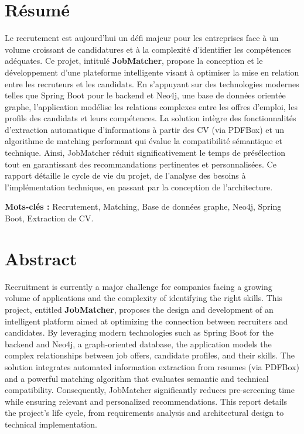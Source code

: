 \documentclass[12pt,a4paper]{report}
\begin{document}
\chapter*{Résumé}
Le recrutement est aujourd'hui un défi majeur pour les entreprises face à un volume croissant de candidatures et à la complexité d'identifier les compétences adéquates. Ce projet, intitulé \textbf{JobMatcher}, propose la conception et le développement d'une plateforme intelligente visant à optimiser la mise en relation entre les recruteurs et les candidats. En s'appuyant sur des technologies modernes telles que Spring Boot pour le backend et Neo4j, une base de données orientée graphe, l'application modélise les relations complexes entre les offres d'emploi, les profils des candidats et leurs compétences. La solution intègre des fonctionnalités d'extraction automatique d'informations à partir des CV (via PDFBox) et un algorithme de matching performant qui évalue la compatibilité sémantique et technique. Ainsi, JobMatcher réduit significativement le temps de présélection tout en garantissant des recommandations pertinentes et personnalisées. Ce rapport détaille le cycle de vie du projet, de l'analyse des besoins à l'implémentation technique, en passant par la conception de l'architecture.

\textbf{Mots-clés :} Recrutement, Matching, Base de données graphe, Neo4j, Spring Boot, Extraction de CV.
\clearpage

\chapter*{Abstract}
Recruitment is currently a major challenge for companies facing a growing volume of applications and the complexity of identifying the right skills. This project, entitled \textbf{JobMatcher}, proposes the design and development of an intelligent platform aimed at optimizing the connection between recruiters and candidates. By leveraging modern technologies such as Spring Boot for the backend and Neo4j, a graph-oriented database, the application models the complex relationships between job offers, candidate profiles, and their skills. The solution integrates automated information extraction from resumes (via PDFBox) and a powerful matching algorithm that evaluates semantic and technical compatibility. Consequently, JobMatcher significantly reduces pre-screening time while ensuring relevant and personalized recommendations. This report details the project's life cycle, from requirements analysis and architectural design to technical implementation.
\end{document}
